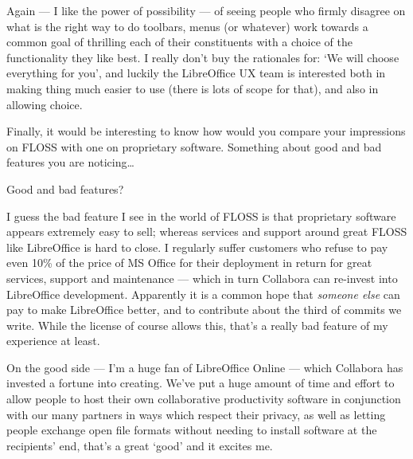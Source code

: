 \documentclass[10pt, a5paper]{article}
\begin{document}
\begin{Parallel}[p]{}{}
{Again — I like the power of possibility — of seeing people who firmly disagree on what is the right way to do toolbars, menus (or whatever) work towards a common goal of thrilling each of their constituents with a choice of the functionality they like best. I really don't buy the rationales for: ‘We will choose everything for you’, and luckily the LibreOffice UX team is interested both in making thing much easier to use (there is lots of scope for that), and also in allowing choice.

\newpage
\q Finally, it would be interesting to know how would you compare your impressions on FLOSS with one on proprietary software. Something about good and bad features you are noticing…

\a Good and bad features?

I guess the bad feature I see in the world of FLOSS is that proprietary software appears extremely easy to sell; whereas services and support around great FLOSS like LibreOffice is hard to close. I regularly suffer customers who refuse to pay even 10\% of the price of MS Office for their deployment in return for great services, support and maintenance — which in turn Collabora can re-invest into LibreOffice development. Apparently it is a common hope that \emph{someone else} can pay to make LibreOffice better, and to contribute about the third of commits we write. While the license of course allows this, that's a really bad feature of my experience at least.

On the good side — I'm a huge fan of LibreOffice Online — which Collabora has invested a fortune into creating. We've put a huge amount of time and effort to allow people to host their own collaborative \linebreak productivity software in conjunction with our many partners in ways which respect their privacy, as well as letting people exchange open file formats without needing to install software at the recipients' end, that's a great ‘good’ and it excites me.

\vfill
     }
\end{Parallel}
\end{document}
